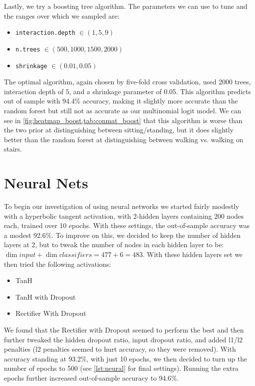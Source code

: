 Lastly, we try a boosting tree algorithm. The parameters we can use to tune and the ranges over which we sampled are:
\begin{itemize}
\item \texttt{interaction.depth} $\in (1, 5, 9)$
\item \texttt{n.trees} $\in (500, 1000, 1500, 2000)$
\item \texttt{shrinkage} $\in (0.01, 0.05)$
\end{itemize}
The optimal algorithm, again chosen by five-fold cross validation, used 2000 trees, interaction depth of 5, and a shrinkage parameter of 0.05. This algorithm predicts out of sample with 94.4\% accuracy, making it slightly more accurate than the random forest but still not as accurate as our multinomial logit model. We can see in \vref{fig:heatmap_boost,tab:conmat_boost} that this algorithm is worse than the two prior at distinguishing between sitting/standing, but it does slightly better than the random forest at distinguishing between walking vs. walking on stairs.

\section{Neural Nets} \label{sec:nnets}
To begin our investigation of using neural networks we started fairly modestly with a hyperbolic tangent activation, with 2-hidden layers containing 200 nodes each, trained over 10 epochs.  With these settings, the out-of-sample accuracy was a modest 92.6\%.  To improve on this, we decided to keep the number of hidden layers at 2, but to tweak the number of nodes in each hidden layer to be: $\dim input + \dim classifiers = 477 + 6 = 483$.  With these hidden layers set we then tried the following activations:
\begin{itemize}
\item TanH
\item TanH with Dropout
\item Rectifier With Dropout
\end{itemize}

We found that the Rectifier with Dropout seemed to perform the best and then further tweaked the hidden dropout ratio, input dropout ratio, and added l1/l2 penalties (l2 penalties seemed to hurt accuracy, so they were removed).  With accuracy standing at 93.2\%, with just 10 epochs, we then decided to turn up the number of epochs to 500 (see \cref{lst:neural} for final settings).  Running the extra epochs further increased out-of-sample accuracy to 94.6\%.

